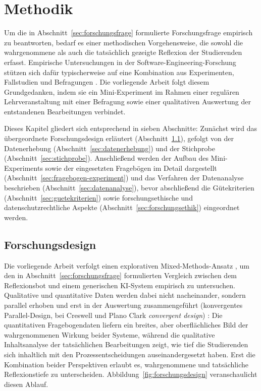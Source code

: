 \chapter{Methodik}
\label{cha:methodik}

Um die in Abschnitt~\ref{sec:forschungsfrage} formulierte Forschungsfrage empirisch zu beantworten,
bedarf es einer methodischen Vorgehensweise, die sowohl die wahrgenommene als auch die tatsächlich
gezeigte Reflexion der Studierenden erfasst. Empirische Untersuchungen in der
Software-Engineering-Forschung stützen sich dafür typischerweise auf eine Kombination aus Experimenten,
Fallstudien und Befragungen \cite{stolGuidelinesConductingSoftware2020}. Die vorliegende Arbeit folgt
diesem Grundgedanken, indem sie ein Mini-Experiment im Rahmen einer regulären Lehrveranstaltung mit
einer Befragung sowie einer qualitativen Auswertung der entstandenen Bearbeitungen verbindet.

Dieses Kapitel gliedert sich entsprechend in sieben Abschnitte: Zunächst wird das übergeordnete
Forschungsdesign erläutert (Abschnitt~\ref{sec:forschungsdesign}), gefolgt von der Datenerhebung
(Abschnitt~\ref{sec:datenerhebung}) und der Stichprobe (Abschnitt~\ref{sec:stichprobe}). Anschließend
werden der Aufbau des Mini-Experiments sowie der eingesetzten Fragebögen im Detail dargestellt
(Abschnitt~\ref{sec:fragebogen-experiment}) und das Verfahren der Datenanalyse beschrieben
(Abschnitt~\ref{sec:datenanalyse}), bevor abschließend die Gütekriterien
(Abschnitt~\ref{sec:guetekriterien}) sowie forschungsethische und datenschutzrechtliche Aspekte
(Abschnitt~\ref{sec:forschungsethik}) eingeordnet werden.

\section{Forschungsdesign}
\label{sec:forschungsdesign}
Die vorliegende Arbeit verfolgt einen explorativen Mixed-Methods-Ansatz \cite{kuckartzMixedMethodsMethodologie2014},
um den in Abschnitt~\ref{sec:forschungsfrage} formulierten Vergleich zwischen dem Reflexionsbot und
einem generischen KI-System empirisch zu untersuchen. Qualitative und quantitative Daten werden dabei nicht nacheinander, sondern parallel
erhoben und erst in der Auswertung zusammengeführt (konvergentes Parallel-Design, bei Creswell und
Plano Clark \emph{convergent design})
\cite{kuckartzMixedMethodsMethodologie2014, creswellDesigningConductingMixed2018}: Die quantitativen Fragebogendaten
liefern ein breites, aber oberflächliches Bild der wahrgenommenen Wirkung beider Systeme, während
die qualitative Inhaltsanalyse der tatsächlichen Bearbeitungen zeigt, wie tief die Studierenden sich
inhaltlich mit den Prozessentscheidungen auseinandergesetzt haben. Erst die Kombination beider
Perspektiven erlaubt es, wahrgenommene und tatsächliche Reflexionstiefe zu unterscheiden.
Abbildung~\ref{fig:forschungsdesign} veranschaulicht diesen Ablauf.

